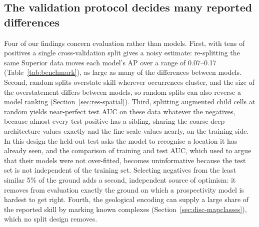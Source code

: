 \documentclass[pdflatex,sn-apa]{sn-jnl}
\begin{document}
\subsection{The validation protocol decides many reported differences}\label{sec:disc-protocol}

Four of our findings concern evaluation rather than models. First, with tens of positives a single cross-validation split gives a noisy estimate: re-splitting the same Superior data moves each model's AP over a range of 0.07--0.17 (Table~\ref{tab:benchmark}), as large as many of the differences between models. Second, random splits overstate skill wherever occurrences cluster, and the size of the overstatement differs between models, so random splits can also reverse a model ranking (Section~\ref{sec:res-spatial}). Third, splitting augmented child cells at random yields near-perfect test AUC on these data whatever the negatives, because almost every test positive has a sibling, sharing the coarse deep-architecture values exactly and the fine-scale values nearly, on the training side. In this design the held-out test asks the model to recognise a location it has already seen, and the comparison of training and test AUC, which \citet{Parsa2024} used to argue that their models were not over-fitted, becomes uninformative because the test set is not independent of the training set. Selecting negatives from the least similar 5\% of the ground adds a second, independent source of optimism: it removes from evaluation exactly the ground on which a prospectivity model is hardest to get right. Fourth, the geological encoding can supply a large share of the reported skill by marking known complexes (Section~\ref{sec:disc-mapclasses}), which no split design removes.
\end{document}
